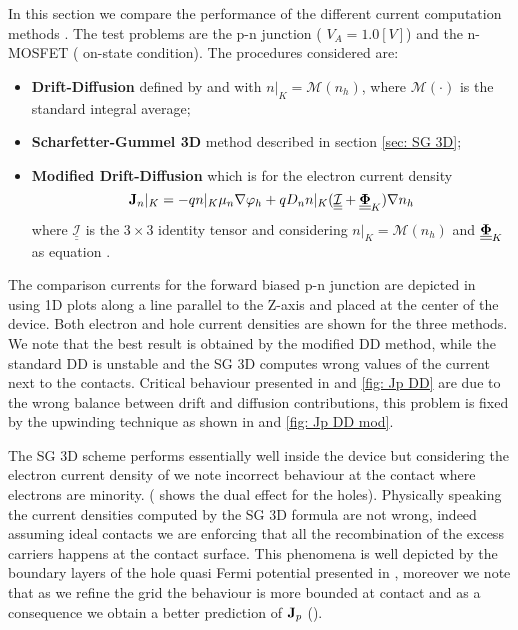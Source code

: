 In this section we compare the performance of the different current computation methods . The test problems are the p-n junction (  $V_A=1.0[V]$) and the n-MOSFET ( on-state condition).
The procedures considered are:
\begin{itemize}
\item {\bf Drift-Diffusion} defined by  and  with $n|_K=\mathcal{M}(n_h)$, where $\mathcal{M}(\cdot)$ is the standard integral average;
\item {\bf Scharfetter-Gummel 3D} method described in section \ref{sec: SG 3D};
\item {\bf Modified Drift-Diffusion} which is for the electron current density 
\begin{equation}
\mathbf{J}_n|_K = -qn|_K\mu_n\nabla \varphi_h + qD_nn|_K(\underline{\underline{\mathcal{I}}}+\underline{\underline{\mathbf{\Phi}}}_K) \nabla n_h 
\end{equation}
where $\underline{\underline{\mathcal{I}}}$ is the $3\times 3$ identity tensor and considering $n|_K=\mathcal{M}(n_h)$ and $\underline{\underline{\mathbf{\Phi}}}_K$ as equation .
\end{itemize}

The comparison currents for the forward biased p-n junction are depicted in  using 1D plots along a line parallel to the Z-axis and placed at the center of the device. Both electron and hole current densities are shown for the three methods. 
We note that the best result is obtained by the modified DD method, while the standard DD is unstable and the SG 3D computes wrong values of the current next to the contacts. 
Critical behaviour presented in  and \ref{fig: Jp DD} are due to the wrong balance between drift and diffusion contributions, this problem is fixed by the upwinding technique as shown in  and \ref{fig: Jp DD mod}.

The SG 3D scheme performs essentially well inside the device but considering the electron current density of  we note incorrect behaviour at the contact where electrons are minority. ( shows the dual effect for the holes). Physically speaking the current densities computed by the SG 3D formula are not wrong, indeed assuming ideal contacts we are enforcing that all the recombination of the excess carriers happens at the contact surface. This phenomena is well depicted by the boundary layers of the hole quasi Fermi potential presented in , moreover we note that as we refine the grid the behaviour is more bounded at contact and as a consequence we obtain a better prediction of $\mathbf{J}_p$ ().

